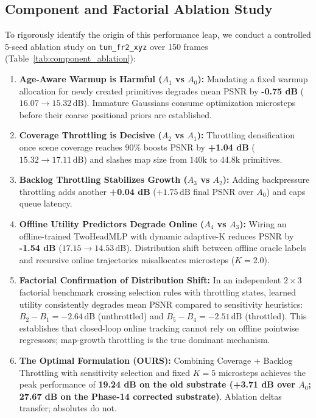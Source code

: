 \documentclass[10pt,twocolumn,letterpaper]{article}
\begin{document}
\subsection{Component and Factorial Ablation Study}
To rigorously identify the origin of this performance leap, we conduct a controlled 5-seed ablation study on \texttt{tum\_fr2\_xyz} over 150 frames (Table~\ref{tab:component_ablation}):
\begin{enumerate}
\setlength{\itemsep}{2pt}
\item \textbf{Age-Aware Warmup is Harmful ($A_1$ vs $A_0$):} Mandating a fixed warmup allocation for newly created primitives degrades mean PSNR by \textbf{-0.75 dB} ($16.07 \to 15.32\,\mathrm{dB}$). Immature Gaussians consume optimization microsteps before their coarse positional priors are established.
\item \textbf{Coverage Throttling is Decisive ($A_2$ vs $A_1$):} Throttling densification once scene coverage reaches $90\%$ boosts PSNR by \textbf{+1.04 dB} ($15.32 \to 17.11\,\mathrm{dB}$) and slashes map size from $140\mathrm{k}$ to $44.8\mathrm{k}$ primitives.
\item \textbf{Backlog Throttling Stabilizes Growth ($A_3$ vs $A_2$):} Adding backpressure throttling adds another \textbf{+0.04 dB} ($+1.75\,\mathrm{dB}$ final PSNR over $A_0$) and caps queue latency.
\item \textbf{Offline Utility Predictors Degrade Online ($A_4$ vs $A_3$):} Wiring an offline-trained TwoHeadMLP with dynamic adaptive-K reduces PSNR by \textbf{-1.54 dB} ($17.15 \to 14.53\,\mathrm{dB}$). Distribution shift between offline oracle labels and recursive online trajectories misallocates microsteps ($K=2.0$).
\item \textbf{Factorial Confirmation of Distribution Shift:} In an independent $2\times 3$ factorial benchmark crossing selection rules with throttling states, learned utility consistently degrades mean PSNR compared to sensitivity heuristics: $B_2 - B_1 = -2.64\,\mathrm{dB}$ (unthrottled) and $B_5 - B_4 = -2.51\,\mathrm{dB}$ (throttled). This establishes that closed-loop online tracking cannot rely on offline pointwise regressors; map-growth throttling is the true dominant mechanism.
\item \textbf{The Optimal Formulation (OURS):} Combining Coverage + Backlog Throttling with sensitivity selection and fixed $K=5$ microsteps achieves the peak performance of \textbf{19.24 dB on the old substrate (+3.71 dB over $A_0$; 27.67 dB on the Phase-14 corrected substrate)}. Ablation deltas transfer; absolutes do not.
\end{enumerate}
\end{document}
